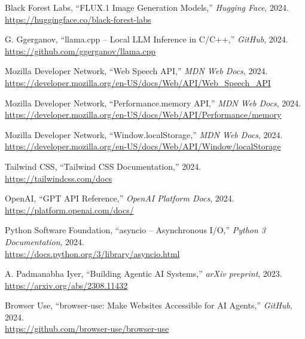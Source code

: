 \begin{enumerate}[leftmargin=*, label={[\arabic*]}]
    \item Black Forest Labs, ``FLUX.1 Image Generation Models,'' \textit{Hugging Face}, 2024.\\
          \url{https://huggingface.co/black-forest-labs}

    \item G. Ggerganov, ``llama.cpp -- Local LLM Inference in C/C++,'' \textit{GitHub}, 2024.\\
          \url{https://github.com/ggerganov/llama.cpp}

    \item Mozilla Developer Network, ``Web Speech API,'' \textit{MDN Web Docs}, 2024.\\
          \url{https://developer.mozilla.org/en-US/docs/Web/API/Web_Speech_API}

    \item Mozilla Developer Network, ``Performance.memory API,'' \textit{MDN Web Docs}, 2024.\\
          \url{https://developer.mozilla.org/en-US/docs/Web/API/Performance/memory}

    \item Mozilla Developer Network, ``Window.localStorage,'' \textit{MDN Web Docs}, 2024.\\
          \url{https://developer.mozilla.org/en-US/docs/Web/API/Window/localStorage}

    \item Tailwind CSS, ``Tailwind CSS Documentation,'' 2024.\\
          \url{https://tailwindcss.com/docs}

    \item OpenAI, ``GPT API Reference,'' \textit{OpenAI Platform Docs}, 2024.\\
          \url{https://platform.openai.com/docs/}

    \item Python Software Foundation, ``asyncio -- Asynchronous I/O,'' \textit{Python 3 Documentation}, 2024.\\
          \url{https://docs.python.org/3/library/asyncio.html}

    \item A. Padmanabha Iyer, ``Building Agentic AI Systems,'' \textit{arXiv preprint}, 2023.\\
          \url{https://arxiv.org/abs/2308.11432}

    \item Browser Use, ``browser-use: Make Websites Accessible for AI Agents,'' \textit{GitHub}, 2024.\\
          \url{https://github.com/browser-use/browser-use}

\end{enumerate}
